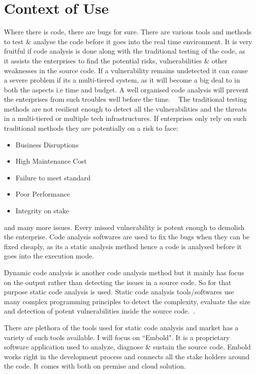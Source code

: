\section{Context of Use}
	Where there is code, there are bugs for sure. There are various tools and methods to test \& analyse the code before it goes into the real time environment. It is very fruitful if code analysis is done along with the traditional testing of the code, as it assists the enterprises to find the potential risks, vulnerabilities \& other weaknesses in the source code. If a vulnerability remains undetected it can cause a severe problem if its a multi-tiered system, as it will become a big deal to in both the aspects i.e time and budget. A well organised code analysis will prevent the enterprises from such troubles well before the time. ~\cite{C1}
	The traditional testing methods are not resilient enough to detect all the vulnerabilities and the threats in a multi-tiered or multiple tech infrastructures. If enterprises only rely on such traditional methods they are potentially on a risk to face:
	\begin{itemize}
	\item Business Disruptions
	\item High Maintenance Cost
	\item Failure to meet standard
	\item Poor Performance
	\item Integrity on stake
	\end{itemize}
and many more issues. Every missed vulnerability is potent enough to demolish the enterprise. Code analysis softwares are used to fix the bugs when they can be fixed cheaply, as its a static analysis method hence a code is analysed before it goes into the execution mode. \par
Dynamic code analysis is another code analysis method but it mainly has focus on the output rather than detecting the issues in a source code. So for that purpose static code analysis is used. Static code analysis tools/softwares use many complex programming principles to detect the complexity, evaluate the size and detection of potent vulnerabilities inside the source code.~\cite{Embold}. \par
There are plethora of the tools used for static code analysis and market has a variety of such tools available. I will focus on ``Embold". It is a proprietary software application used to analyze, diagnose \& sustain the source code. Embold works right in the development process and connects all the stake holders around the code. It comes with both on premise and cloud solution. \par
